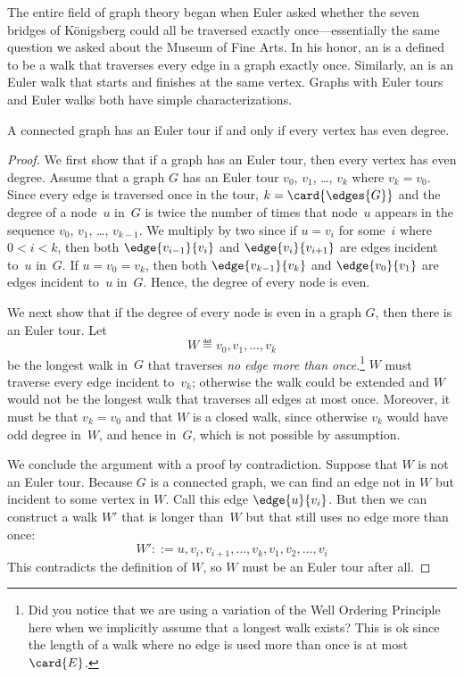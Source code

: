 The entire field of graph theory began when Euler asked whether the
seven bridges of K\"onigsberg could all be traversed exactly
once---essentially the same question we asked about the Museum of Fine
Arts.  In his honor, an  is a defined to be a walk
that traverses every edge in a graph exactly once.  Similarly, an
 is an Euler walk that starts and finishes at the
same vertex.  Graphs with Euler tours and Euler walks both have simple
characterizations.
\begin{theorem}\label{thm:euler-tour}
A connected graph has an Euler tour if and only if every vertex has
even degree.
\end{theorem}

\begin{proof}
  We first show that if a graph has an Euler tour, then every vertex has
  even degree.  Assume that a graph $G$ has an Euler tour $v_0$, $v_1$,
  \dots, $v_k$ where $v_k = v_0$.  Since every edge is traversed once in
  the tour, $k = \card{\edges{G}}$ and the degree of a node~$u$ in~$G$ is
  twice the number of times that node~$u$ appears in the sequence $v_0$,
  $v_1$, \dots, $v_{k-1}$.  We multiply by two since if $u = v_i$ for
  some~$i$ where $0 < i < k$, then both $\edge{v_{i - 1}}{v_i}$ and
  $\edge{v_i}{v_{i + 1}}$ are edges incident to~$u$ in~$G$.  If $u = v_0 =
  v_k$, then both $\edge{v_{k - 1}}{v_k}$ and $\edge{v_0}{v_1}$ are edges
  incident to~$u$ in~$G$.  Hence, the degree of every node is even.

We next show that if the degree of every node is even in a graph
$G$, then there is an Euler tour.  Let
\[
W \eqdef v_0, v_1, \dots, v_k
\]
be the longest walk in~$G$ that traverses \emph{no edge more than
  once}.\footnote{Did you notice that we are using a variation of the Well
  Ordering Principle here when we implicitly assume that a longest walk
  exists?  This is ok since the length of a walk where no edge is used
  more than once is at most~$\card{E}$.}  $W$ must traverse every edge
incident to~$v_k$; otherwise the walk could be extended and $W$ would not
be the longest walk that traverses all edges at most once.  Moreover, it
must be that $v_k = v_0$ and that $W$ is a closed walk, since otherwise
$v_k$ would have odd degree in~$W$, and hence in~$G$, which is not
possible by assumption.

We conclude the argument with a proof by contradiction.  Suppose that
$W$ is not an Euler tour.  Because $G$ is a connected graph, we can
find an edge not in $W$ but incident to some vertex in $W$.  Call this
edge $\edge{u}{v_i}$.  But then we can construct a walk $W'$ that is
longer than~$W$ but that still uses no edge more than once:
\begin{equation*}
    W' ::= u, v_i, v_{i + 1}, \dots, v_k, v_1, v_2, \dots, v_i
\end{equation*}
%
This contradicts the definition of $W$, so $W$ must be an
Euler tour after all.
\end{proof}

